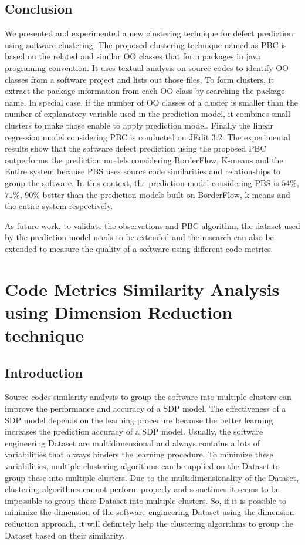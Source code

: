 \documentclass[12pt]{report}
\begin{document}
\section{Conclusion}

We presented and experimented a new clustering technique for defect prediction using software clustering. The proposed clustering technique named as PBC is based on the related and similar OO classes that form packages in java programing convention. It uses textual analysis on source codes to identify OO classes from a software project and lists out those files. To form clusters, it extract the package information from each OO class by searching the package name. In special case, if the number of OO classes of a cluster is smaller than the number of explanatory variable used in the prediction model, it combines small clusters to make those enable to apply prediction model. Finally the linear regression model considering PBC is conducted on JEdit $3.2$. The experimental results show that the software defect prediction using the proposed PBC outperforms the prediction models considering BorderFlow, K-means and the Entire system because PBS uses source code similarities and relationships to group the software. In this context, the prediction model considering PBS is  $54\%$, $71\%$, $90\%$ better than the prediction models built on BorderFlow, k-means and the entire system respectively. 

As future work, to validate the observations and PBC algorithm, the dataset used by the prediction model needs to be extended and the research can also be extended to measure the quality of a software using different code metrics.  

\chapter{Code Metrics Similarity Analysis using Dimension Reduction technique}
\section{Introduction}

Source codes similarity analysis to group the software into multiple clusters can improve the performance and accuracy of a SDP model. The effectiveness of a SDP model depends on the learning procedure because the better learning increases the prediction accuracy of a SDP model. Usually, the software engineering Dataset are multidimensional and always contains a lots of variabilities that always hinders the learning procedure. To minimize these variabilities, multiple clustering algorithms can be applied on the Dataset to group these into multiple clusters. Due to the multidimensionality of the Dataset, clustering algorithms cannot perform properly and sometimes it seems to be impossible to group these Dataset into multiple clusters. So, if it is possible to minimize the dimension of the software engineering Dataset using the dimension reduction approach, it will definitely help the clustering algorithms to group the Dataset based on their similarity. 
\end{document}
